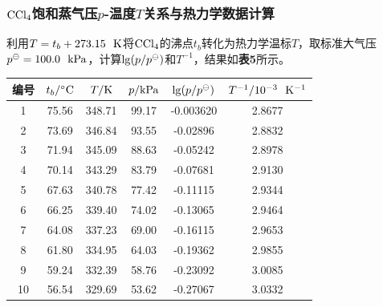 \documentclass[12pt]{article}
\begin{document}
 \subsubsection{$\rm CCl_{4}$饱和蒸气压$p$-温度$T$关系与热力学数据计算}
利用$T=t_{b}+273.15\ \ {\rm K}$将$\rm CCl_{4}$的沸点$t_{b}$转化为热力学温标$T$，取标准大气压$p^{\ominus}=100.0\ \ {\rm kPa}$，计算${\rm lg}(p/p^{\ominus})$和$T^{-1}$，结果如\textbf{表5}所示。
\begin{table}[h]
	\centering
	\begin{tabular}{cccccc}
		\toprule
		编号 & $t_{b}/{\rm ^{\circ}C}$& $T/{\rm K}$ & $p/{\rm kPa}$ & ${\rm lg}(p/p^{\ominus})$ & $T^{-1}/{\rm 10^{-3}\ \  K^{-1}}$\\
		\midrule
		1  & 75.56 & 348.71 & 99.17 & -0.003620 & 2.8677 \\
		2  & 73.69 & 346.84 & 93.55 & -0.02896 & 2.8832 \\
		3  & 71.94 & 345.09 & 88.63 & -0.05242 & 2.8978 \\
		4  & 70.14 & 343.29 & 83.79 & -0.07681 & 2.9130 \\
		5  & 67.63 & 340.78 & 77.42 & -0.11115 & 2.9344 \\
		6  & 66.25 & 339.40 & 74.02 & -0.13065 & 2.9464 \\
		7  & 64.08 & 337.23 & 69.00 & -0.16115 & 2.9653 \\
		8  & 61.80 & 334.95 & 64.03 & -0.19362 & 2.9855 \\
		9  & 59.24 & 332.39 & 58.76 & -0.23092 & 3.0085 \\
		10 & 56.54 & 329.69 & 53.62 & -0.27067 & 3.0332 \\
		\bottomrule
	\end{tabular}
\end{table}
\par
\end{document}

